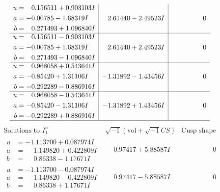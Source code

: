 \documentclass[1p]{elsarticle_modified}
\theoremstyle{definition}
\newcommand{\I}{\sqrt{-1}}
\begin{document}
$$\begin{array}{c|c|c}
\begin{aligned}
u &= \phantom{-}0.156511 + 0.903103 I \\
a &= -0.00785 - 1.68319 I \\
b &= \phantom{-}0.271493 + 1.096840 I\end{aligned}
 & \phantom{-}2.61440 - 2.49523 I & \phantom{-0.000000 } 0 \\ \hline\begin{aligned}
u &= \phantom{-}0.156511 - 0.903103 I \\
a &= -0.00785 + 1.68319 I \\
b &= \phantom{-}0.271493 - 1.096840 I\end{aligned}
 & \phantom{-}2.61440 + 2.49523 I & \phantom{-0.000000 } 0 \\ \hline\begin{aligned}
u &= \phantom{-}0.968058 + 0.543641 I \\
a &= -0.85420 + 1.31106 I \\
b &= -0.292289 - 0.886916 I\end{aligned}
 & -1.31892 - 1.43456 I & \phantom{-0.000000 } 0 \\ \hline\begin{aligned}
u &= \phantom{-}0.968058 - 0.543641 I \\
a &= -0.85420 - 1.31106 I \\
b &= -0.292289 + 0.886916 I\end{aligned}
 & -1.31892 + 1.43456 I & \phantom{-0.000000 } 0\\
 \hline 
 \end{array}$$\newpage$$\begin{array}{c|c|c}  
\text{Solutions to }I^u_{1}& \I (\text{vol} + \sqrt{-1}CS) & \text{Cusp shape}\\
 \hline 
\begin{aligned}
u &= -1.113700 + 0.087974 I \\
a &= \phantom{-}1.149820 + 0.422809 I \\
b &= \phantom{-}0.86338 - 1.17671 I\end{aligned}
 & \phantom{-}0.97417 + 5.88587 I & \phantom{-0.000000 } 0 \\ \hline\begin{aligned}
u &= -1.113700 - 0.087974 I \\
a &= \phantom{-}1.149820 - 0.422809 I \\
b &= \phantom{-}0.86338 + 1.17671 I\end{aligned}
 & \phantom{-}0.97417 - 5.88587 I & \phantom{-0.000000 } 0 \\ \hline\begin{aligned}

\end{aligned}
\end{array}$$
\end{document}
